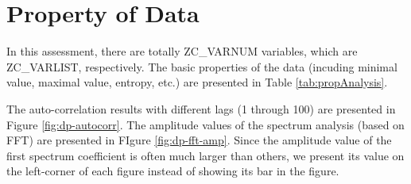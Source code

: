 \section{Property of Data}

In this assessment, there are totally ZC_VARNUM variables, which are ZC_VARLIST, respectively. 
The basic properties of the data (incuding minimal value, maximal value, entropy, etc.) are presented in Table \ref{tab:propAnalysis}. 


The auto-correlation results with different lags (1 through 100) are presented in Figure \ref{fig:dp-autocorr}.
The amplitude values of the spectrum analysis (based on FFT) are presented in FIgure \ref{fig:dp-fft-amp}. Since the amplitude value of the first spectrum coefficient is often much larger than others, we present its value on the left-corner of each figure instead of showing its bar in the figure. 

